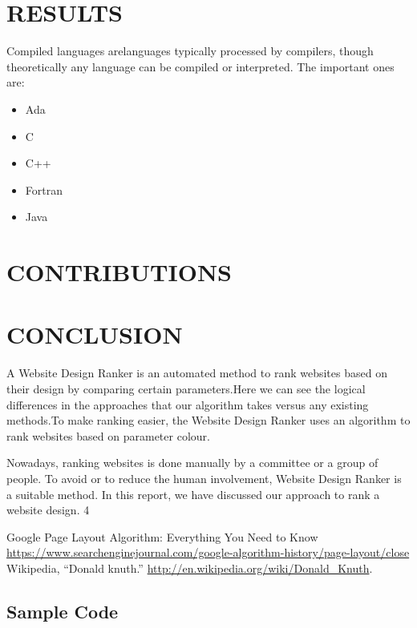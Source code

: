 \documentclass{fisatproject}
\begin{document}
\chapter{RESULTS}

Compiled languages arelanguages typically processed by compilers, though theoretically any language can be compiled or interpreted. The important ones are:
\begin{itemize}
\item Ada
\item C
\item C++
\item Fortran
\item Java
\end{itemize}

\chapter{CONTRIBUTIONS}

\chapter{CONCLUSION}

A Website Design Ranker is an automated method to rank websites based on their design by comparing certain parameters.Here we can see the logical differences in the approaches that our algorithm takes versus any existing methods.To make ranking easier, the Website Design Ranker uses an algorithm to rank websites based on parameter colour.

Nowadays, ranking websites is done manually by a committee or a group of people. To avoid or to reduce the human involvement, Website Design Ranker is a suitable method. In this report, we have discussed our approach to rank a website design.
4


\begin{thebibliography}{1}
 Google Page Layout Algorithm: Everything You Need to
Know
 \url{https://www.searchenginejournal.com/google-algorithm-history/page-layout/close}
 Wikipedia, ``Donald knuth.'' \url{http://en.wikipedia.org/wiki/Donald_Knuth}.
\end{thebibliography}

\begin{appendices}
\chapter{Sample Code}
\begin{lstlisting}[language=c++]

\end{lstlisting}
\end{appendices}
\end{document}
